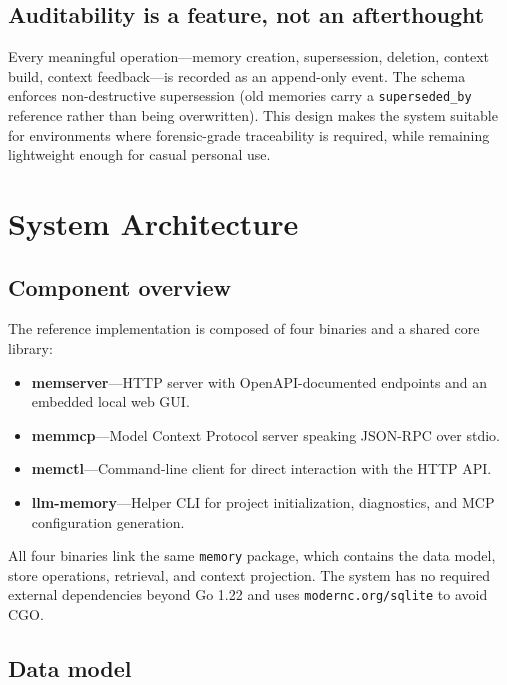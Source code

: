 \documentclass[11pt,a4paper]{article}
\begin{document}
\subsection{Auditability is a feature, not an afterthought}

Every meaningful operation---memory creation, supersession, deletion, context build, context feedback---is recorded as an append-only event. The schema enforces non-destructive supersession (old memories carry a \texttt{superseded\_by} reference rather than being overwritten). This design makes the system suitable for environments where forensic-grade traceability is required, while remaining lightweight enough for casual personal use.

\section{System Architecture}

\subsection{Component overview}

The reference implementation is composed of four binaries and a shared core library:

\begin{itemize}
 \item \textbf{memserver}---HTTP server with OpenAPI-documented endpoints and an embedded local web GUI.
 \item \textbf{memmcp}---Model Context Protocol server speaking JSON-RPC over stdio.
 \item \textbf{memctl}---Command-line client for direct interaction with the HTTP API.
 \item \textbf{llm-memory}---Helper CLI for project initialization, diagnostics, and MCP configuration generation.
\end{itemize}

All four binaries link the same \texttt{memory} package, which contains the data model, store operations, retrieval, and context projection. The system has no required external dependencies beyond Go 1.22 and uses \texttt{modernc.org/sqlite} to avoid CGO.

\subsection{Data model}
\end{document}
